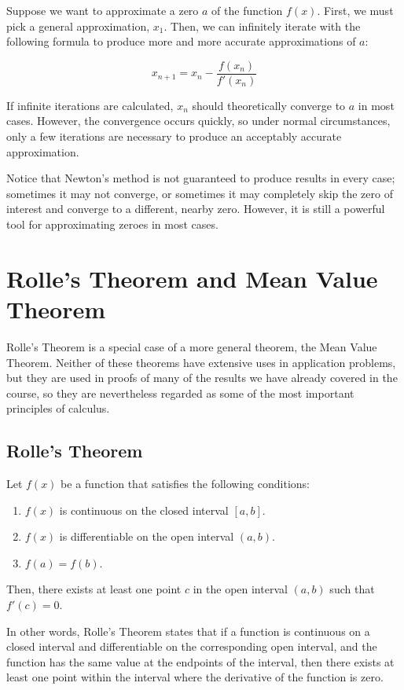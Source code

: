\documentclass[11pt]{article}
\begin{document}
Suppose we want to approximate a zero $a$ of the function $f(x)$. First, we must pick a general approximation, $x_1$. Then, we can infinitely iterate with the following formula to produce more and more accurate approximations of $a$:

\[ x_{n+1} = x_n - \frac{f(x_n)}{f'(x_n)}\]

If infinite iterations are calculated, $x_n$ should theoretically converge to $a$ in most cases. However, the convergence occurs quickly, so under normal circumstances, only a few iterations are necessary to produce an acceptably accurate approximation.

Notice that Newton's method is not guaranteed to produce results in every case; sometimes it may not converge, or sometimes it may completely skip the zero of interest and converge to a different, nearby zero. However, it is still a powerful tool for approximating zeroes in most cases.

\section{Rolle's Theorem and Mean Value Theorem}
Rolle's Theorem is a special case of a more general theorem, the Mean Value Theorem. Neither of these theorems have extensive uses in application problems, but they are used in proofs of many of the results we have already covered in the course, so they are nevertheless regarded as some of the most important principles of calculus.

\subsection{Rolle's Theorem}
Let \(f(x)\) be a function that satisfies the following conditions:

\begin{enumerate}
  \item \(f(x)\) is continuous on the closed interval \([a, b]\).
  \item \(f(x)\) is differentiable on the open interval \((a, b)\).
  \item \(f(a) = f(b)\).
\end{enumerate}

Then, there exists at least one point \(c\) in the open interval \((a, b)\) such that \(f'(c) = 0\).

In other words, Rolle's Theorem states that if a function is continuous on a closed interval and differentiable on the corresponding open interval, and the function has the same value at the endpoints of the interval, then there exists at least one point within the interval where the derivative of the function is zero.
\end{document}
